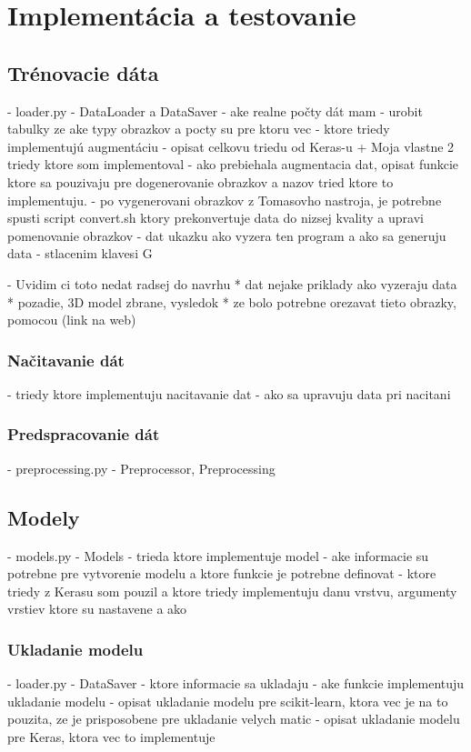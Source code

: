 
\chapter{Implementácia a testovanie}


\section{Trénovacie dáta}
- loader.py - DataLoader a DataSaver
- ake realne počty dát mam
- urobit tabulky ze ake typy obrazkov a pocty su pre ktoru vec
- ktore triedy implementujú augmentáciu
- opisat celkovu triedu od Keras-u + Moja vlastne 2 triedy ktore som implementoval
- ako prebiehala augmentacia dat, opisat funkcie ktore sa pouzivaju pre dogenerovanie obrazkov a nazov tried ktore to implementuju.
- po vygenerovani obrazkov z Tomasovho nastroja, je potrebne spusti script convert.sh ktory prekonvertuje data do nizsej kvality
  a upravi pomenovanie obrazkov
- dat ukazku ako vyzera ten program a ako sa generuju data - stlacenim klavesi G

- Uvidim ci toto nedat radsej do navrhu
    * dat nejake priklady ako vyzeraju data
    * pozadie, 3D model zbrane, vysledok
    * ze bolo potrebne orezavat tieto obrazky, pomocou (link na web)

\subsection{Načitavanie dát}
- triedy ktore implementuju nacitavanie dat
- ako sa upravuju data pri nacitani

\subsection{Predspracovanie dát}
- preprocessing.py - Preprocessor, Preprocessing

\section{Modely}
- models.py - Models
- trieda ktore implementuje model
- ake informacie su potrebne pre vytvorenie modelu a ktore funkcie je potrebne definovat
- ktore triedy z Kerasu som pouzil a ktore triedy implementuju danu vrstvu, argumenty vrstiev ktore su nastavene a ako

\subsection{Ukladanie modelu}
- loader.py - DataSaver
- ktore informacie sa ukladaju
- ake funkcie implementuju ukladanie modelu
- opisat ukladanie modelu pre scikit-learn, ktora vec je na to pouzita, ze je prisposobene pre ukladanie velych matic
- opisat ukladanie modelu pre Keras, ktora vec to implementuje

